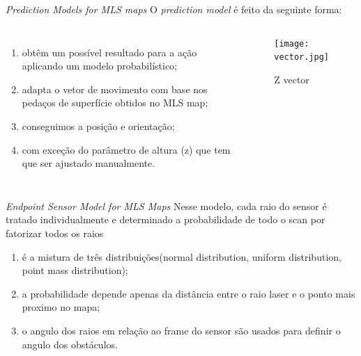 \begin{frame}[c]{\textit{Prediction Models for MLS maps}}
    O \textit{prediction model} é feito da seguinte forma:

    \begin{columns}[t]
            \begin{enumerate}
                \item obtêm um possível resultado para a ação aplicando um modelo probabilístico;
                \item adapta o vetor de movimento com base nos pedaços de superfície obtidos no MLS map;
                \item conseguimos a posição e orientação;
                \item com exceção do parâmetro de altura (z)  que tem que ser ajustado manualmente.
            \end{enumerate}
        \begin{center}
            \begin{figure}
                \texttt{[image: vector.jpg]}
                \caption{Z vector\cite{article}}
            \end{figure}
        \end{center}
    \end{columns}

\end{frame}

\begin{frame}[c]{\textit{Endpoint Sensor Model for MLS Maps}}
    Nesse modelo, cada raio do sensor é tratado individualmente e determinado a probabilidade de todo o scan por fatorizar todos os raios
    \newline

    \begin{enumerate}
        \item é a mistura de três distribuições(normal distribution, uniform distribution, point mass distribution);
        \item a probabilidade depende apenas da distância entre o raio laser e o ponto mais proximo no mapa;
        \item o angulo dos raios em relação ao frame do sensor são usados para definir o angulo dos obstáculos.
    \end{enumerate}

\end{frame}

